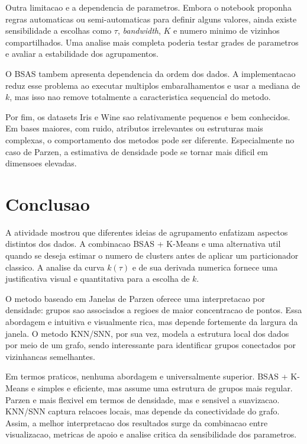 \documentclass[12pt,a4paper]{article}
\begin{document}
Outra limitacao e a dependencia de parametros. Embora o notebook proponha regras
automaticas ou semi-automaticas para definir alguns valores, ainda existe
sensibilidade a escolhas como $\tau$, \textit{bandwidth}, $K$ e numero minimo de
vizinhos compartilhados. Uma analise mais completa poderia testar grades de
parametros e avaliar a estabilidade dos agrupamentos.

O BSAS tambem apresenta dependencia da ordem dos dados. A implementacao reduz
esse problema ao executar multiplos embaralhamentos e usar a mediana de $k$, mas
isso nao remove totalmente a caracteristica sequencial do metodo.

Por fim, os datasets Iris e Wine sao relativamente pequenos e bem conhecidos.
Em bases maiores, com ruido, atributos irrelevantes ou estruturas mais
complexas, o comportamento dos metodos pode ser diferente. Especialmente no
caso de Parzen, a estimativa de densidade pode se tornar mais dificil em
dimensoes elevadas.

\section{Conclusao}

A atividade mostrou que diferentes ideias de agrupamento enfatizam aspectos
distintos dos dados. A combinacao BSAS + K-Means e uma alternativa util quando
se deseja estimar o numero de clusters antes de aplicar um particionador
classico. A analise da curva $k(\tau)$ e de sua derivada numerica fornece uma
justificativa visual e quantitativa para a escolha de $k$.

O metodo baseado em Janelas de Parzen oferece uma interpretacao por densidade:
grupos sao associados a regioes de maior concentracao de pontos. Essa abordagem
e intuitiva e visualmente rica, mas depende fortemente da largura da janela. O
metodo KNN/SNN, por sua vez, modela a estrutura local dos dados por meio de um
grafo, sendo interessante para identificar grupos conectados por vizinhancas
semelhantes.

Em termos praticos, nenhuma abordagem e universalmente superior. BSAS + K-Means
e simples e eficiente, mas assume uma estrutura de grupos mais regular. Parzen e
mais flexivel em termos de densidade, mas e sensivel a suavizacao. KNN/SNN
captura relacoes locais, mas depende da conectividade do grafo. Assim, a melhor
interpretacao dos resultados surge da combinacao entre visualizacao, metricas de
apoio e analise critica da sensibilidade dos parametros.
\end{document}
